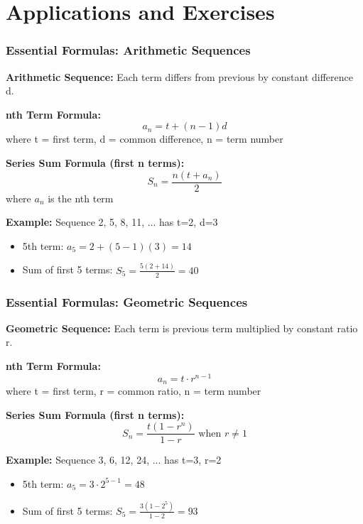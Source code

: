 \documentclass{beamer}
\begin{document}
\section{Applications and Exercises}

\begin{frame}
\frametitle{Essential Formulas: Arithmetic Sequences}
\textbf{Arithmetic Sequence:} Each term differs from previous by constant difference d.

\pause
\textbf{nth Term Formula:}
$$a_n = t + (n-1)d$$
where t = first term, d = common difference, n = term number

\pause
\textbf{Series Sum Formula (first n terms):}
$$S_n = \frac{n(t + a_n)}{2}$$
where $a_n$ is the nth term

\pause
\textbf{Example:} Sequence 2, 5, 8, 11, ... has t=2, d=3
\begin{itemize}
\item 5th term: $a_5 = 2 + (5-1)(3) = 14$
\pause
\item Sum of first 5 terms: $S_5 = \frac{5(2+14)}{2} = 40$
\end{itemize}
\end{frame}

\begin{frame}
\frametitle{Essential Formulas: Geometric Sequences}
\textbf{Geometric Sequence:} Each term is previous term multiplied by constant ratio r.

\pause
\textbf{nth Term Formula:}
$$a_n = t \cdot r^{n-1}$$
where t = first term, r = common ratio, n = term number

\pause
\textbf{Series Sum Formula (first n terms):}
$$S_n = \frac{t(1-r^n)}{1-r} \text{ when } r \neq 1$$

\pause
\textbf{Example:} Sequence 3, 6, 12, 24, ... has t=3, r=2
\begin{itemize}
\item 5th term: $a_5 = 3 \cdot 2^{5-1} = 48$
\pause
\item Sum of first 5 terms: $S_5 = \frac{3(1-2^5)}{1-2} = 93$
\end{itemize}
\end{frame}
\end{document}
